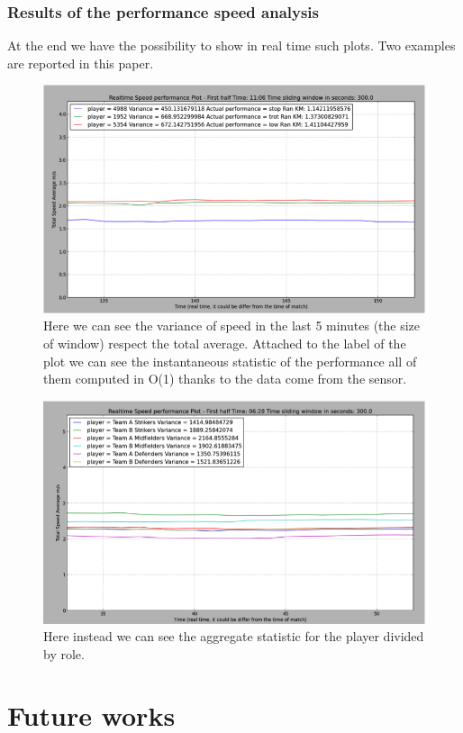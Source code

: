 \documentclass{acm_proc_article-sp-sigmod07}
\begin{document}
\subsubsection{Results of the performance speed analysis}
At the end we have the possibility to show in real time such plots. Two examples are reported in this paper.
\begin{figure}
\includegraphics[scale=0.6]{fuck1}
\caption{Here we can see the variance of speed in the last 5 minutes (the size of window) respect the total average. Attached to the label of the plot we can see the instantaneous statistic of the performance all of them computed in O(1) thanks to the data come from the sensor.}
\end{figure}

\begin{figure}
\includegraphics[scale=0.6]{fuck2}
\caption{Here instead we can see the aggregate statistic for the player divided by role.}
\end{figure}

\section{Future works}
\end{document}
